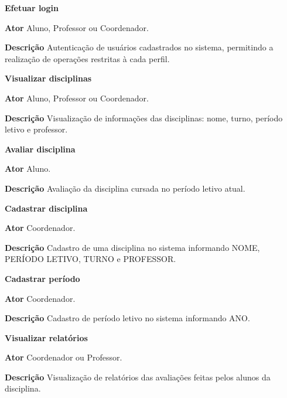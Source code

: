 \begin{alineas}
    \item \textbf{Efetuar login}
        \begin{alineas}
            \item \textbf{Ator} Aluno, Professor ou Coordenador.
            \item \textbf{Descrição} Autenticação de usuários cadastrados no sistema, permitindo a realização de operações restritas à cada perfil.
        \end{alineas}
    \item \textbf{Visualizar disciplinas}
        \begin{alineas}
            \item \textbf{Ator} Aluno, Professor ou Coordenador.
            \item \textbf{Descrição} Visualização de informações das disciplinas: nome, turno, período letivo e professor.
        \end{alineas}
    \item \textbf{Avaliar disciplina}
        \begin{alineas}
            \item \textbf{Ator} Aluno.
            \item \textbf{Descrição} Avaliação da disciplina cursada no período letivo atual.
        \end{alineas}
    \item \textbf{Cadastrar disciplina}
        \begin{alineas}
            \item \textbf{Ator} Coordenador.
            \item \textbf{Descrição} Cadastro de uma disciplina no sistema informando NOME, PERÍODO LETIVO, TURNO e PROFESSOR.
        \end{alineas}
    \item \textbf{Cadastrar período}
        \begin{alineas}
            \item \textbf{Ator} Coordenador.
            \item \textbf{Descrição} Cadastro de período letivo no sistema informando ANO.
        \end{alineas}
    \item \textbf{Visualizar relatórios}
        \begin{alineas}
            \item \textbf{Ator} Coordenador ou Professor.
            \item \textbf{Descrição} Visualização de relatórios das avaliações feitas pelos alunos da disciplina.
        \end{alineas}
\end{alineas}

